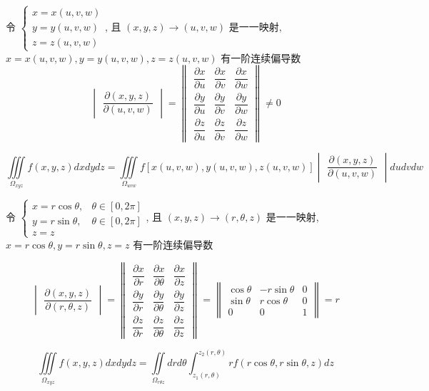\begin{definition}[换元法]
	令 $\begin{cases}
	   x = x(u,v,w) \\
	   y = y(u,v,w) \\
	   z = z(u,v,w)
	\end{cases}$, 且 $(x,y,z)\to (u,v,w)$ 是一一映射, $x = x(u,v,w), y = y(u,v,w), z = z(u,v,w)$ 有一阶连续偏导数
	$$\begin{vmatrix}
		\dfrac{\partial (x,y,z)}{\partial (u,v,w)}
	  \end{vmatrix} = 
	\begin{Vmatrix}
	  \dfrac{\partial x}{\partial u} & \dfrac{\partial x}{\partial v} & \dfrac{\partial x}{\partial w} \\
	  \dfrac{\partial y}{\partial u} & \dfrac{\partial y}{\partial v} & \dfrac{\partial y}{\partial w} \\
	  \dfrac{\partial z}{\partial u} & \dfrac{\partial z}{\partial v} & \dfrac{\partial z}{\partial w}
	\end{Vmatrix}\neq 0$$

	$$\iiint\limits_{\Omega_{xyz}}f(x,y,z)dxdydz = \iiint\limits_{\Omega_{uvw}}f \left[x(u,v,w), y(u,v,w), z(u,v,w)\right] 
	\begin{vmatrix}
	  \dfrac{\partial (x,y,z)}{\partial (u,v,w)}
	\end{vmatrix}
	dudvdw$$
\end{definition}

\begin{definition}[柱面坐标系]
	令 $\begin{cases}
	  x = r\cos \theta, & \theta\in [0,2\pi] \\
	  y = r\sin \theta, & \theta\in [0,2\pi] \\
	  z = z
	\end{cases}$, 且 $(x,y,z)\to (r,\theta,z)$ 是一一映射, $x = r\cos \theta, y = r\sin \theta, z = z$ 有一阶连续偏导数
	
	$$\begin{vmatrix}
		\dfrac{\partial (x,y,z)}{\partial (r,\theta,z)}
	  \end{vmatrix} = 
	\begin{Vmatrix}
	  \dfrac{\partial x}{\partial r} & \dfrac{\partial x}{\partial \theta} & \dfrac{\partial x}{\partial z} \\
	  \dfrac{\partial y}{\partial r} & \dfrac{\partial y}{\partial \theta} & \dfrac{\partial y}{\partial z} \\
	  \dfrac{\partial z}{\partial r} & \dfrac{\partial z}{\partial \theta} & \dfrac{\partial z}{\partial z}
	\end{Vmatrix} = 
	\begin{Vmatrix}
	  \cos \theta & -r\sin \theta & 0 \\
	  \sin \theta & r\cos \theta & 0 \\
	  0 & 0 & 1
	\end{Vmatrix} = r$$
	
	$$\iiint\limits_{\Omega_{xyz}}f(x,y,z)dxdydz=\iint\limits_{\Omega_{r\theta z}}drd\theta \int_{z_{1}(r,\theta)}^{z_{2}(r,\theta)}rf(r\cos \theta,r\sin\theta,z)dz$$
\end{definition}

